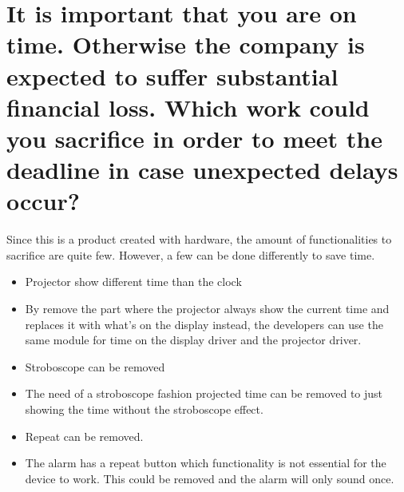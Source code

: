 \documentclass[Main]{subfiles}
\begin{document}
\section{It is important that you are on time. 
	Otherwise the company is expected to suffer substantial financial loss. 
	Which work could you sacrifice in order to meet the deadline in case unexpected delays occur?}

Since this is a product created with hardware, the amount of functionalities to sacrifice are quite few.
However, a few can be done differently to save time. 
\begin{itemize}
	\item Projector show different time than the clock
	\item[] By remove the part where the projector always show the current time and replaces it with what's on the display instead, the developers can use the same module for time on the display driver and the projector driver.

	\item Stroboscope can be removed
	\item[] The need of a stroboscope fashion projected time can be removed to just showing the time without the stroboscope effect.

	\item Repeat can be removed.
	\item[] The alarm has a repeat button which functionality is not essential for the device to work. This could be removed and the alarm will only sound once.
\end{itemize}
\end{document}
